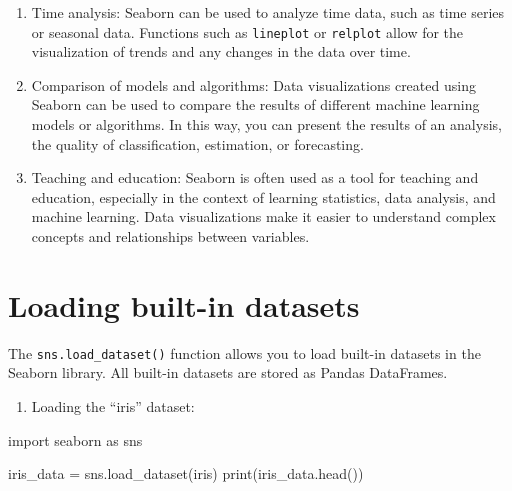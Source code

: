 \documentclass[
  english,
  letterpaper,
  DIV=11,
  numbers=noendperiod]{scrreprt}
\newenvironment{Shaded}{\begin{snugshade}}{\end{snugshade}}
\newcommand{\BuiltInTok}[1]{\textcolor[rgb]{0.00,0.23,0.31}{#1}}
\newcommand{\ImportTok}[1]{\textcolor[rgb]{0.00,0.46,0.62}{#1}}
\newcommand{\NormalTok}[1]{\textcolor[rgb]{0.00,0.23,0.31}{#1}}
\newcommand{\OperatorTok}[1]{\textcolor[rgb]{0.37,0.37,0.37}{#1}}
\newcommand{\StringTok}[1]{\textcolor[rgb]{0.13,0.47,0.30}{#1}}
\providecommand{\tightlist}{%
  \setlength{\itemsep}{0pt}\setlength{\parskip}{0pt}}
\begin{document}
\begin{enumerate}
  Presentations and reports: Seaborn can be used to create high-quality
  data visualizations for the purposes of presentations, reports, or
  scientific publications. The aesthetics and ease of customization of
  charts make the visualizations created in Seaborn readable and
  engaging for the audience.
\item
  Time analysis: Seaborn can be used to analyze time data, such as time
  series or seasonal data. Functions such as \texttt{lineplot} or
  \texttt{relplot} allow for the visualization of trends and any changes
  in the data over time.
\item
  Comparison of models and algorithms: Data visualizations created using
  Seaborn can be used to compare the results of different machine
  learning models or algorithms. In this way, you can present the
  results of an analysis, the quality of classification, estimation, or
  forecasting.
\item
  Teaching and education: Seaborn is often used as a tool for teaching
  and education, especially in the context of learning statistics, data
  analysis, and machine learning. Data visualizations make it easier to
  understand complex concepts and relationships between variables.
\end{enumerate}

\section{Loading built-in datasets}\label{loading-built-in-datasets}

The \texttt{sns.load\_dataset()} function allows you to load built-in
datasets in the Seaborn library. All built-in datasets are stored as
Pandas DataFrames.

\begin{enumerate}
\def\labelenumi{\arabic{enumi}.}
\tightlist
\item
  Loading the ``iris'' dataset:
\end{enumerate}

\begin{Shaded}
\begin{Highlighting}[]
\ImportTok{import}\NormalTok{ seaborn }\ImportTok{as}\NormalTok{ sns}

\NormalTok{iris\_data }\OperatorTok{=}\NormalTok{ sns.load\_dataset(}\StringTok{\textquotesingle{}iris\textquotesingle{}}\NormalTok{)}
\BuiltInTok{print}\NormalTok{(iris\_data.head())}
\end{Highlighting}
\end{Shaded}
\end{document}
